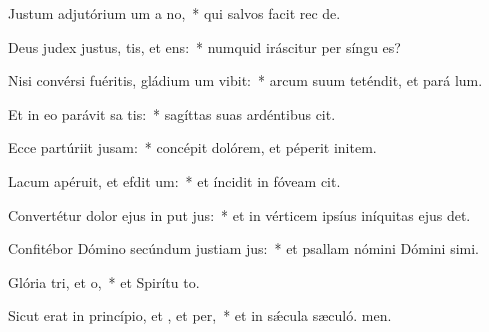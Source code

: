 \item Justum adjutórium um a no,~* qui salvos facit rec de.
\item Deus judex justus, tis, et ens:~* numquid iráscitur per síngu es?
\item Nisi convérsi fuéritis, gládium um vibit:~* arcum suum teténdit, et pará lum.
\item Et in eo parávit sa tis:~* sagíttas suas ardéntibus cit.
\item Ecce partúriit jusam:~* concépit dolórem, et péperit initem.
\item Lacum apéruit, et efdit um:~* et íncidit in fóveam  cit.
\item Convertétur dolor ejus in put jus:~* et in vérticem ipsíus iníquitas ejus det.
\item Confitébor Dómino secúndum justiam jus:~* et psallam nómini Dómini simi.
\item Glória tri, et o,~* et Spirítu to.
\item Sicut erat in princípio, et , et per,~* et in sǽcula sæculó. men.
